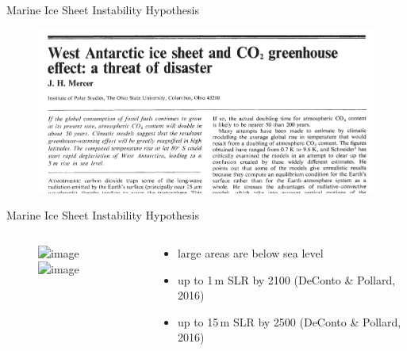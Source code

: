 \documentclass[hide notes,intlimits]{beamer}
\begin{document}
\begin{frame}{Marine Ice Sheet Instability Hypothesis}
 \begin{figure}
    \includegraphics[width=\textwidth]{mercer_1978}
  \end{figure}
\end{frame}

\begin{frame}{Marine Ice Sheet Instability Hypothesis}
  \begin{columns}[c]
    \begin{column}{.65\linewidth}
      \begin{figure}
        \includegraphics<1>[height=8cm]{ant-marine}
        \includegraphics<2>[height=8cm]{ant-shelves}
      \end{figure}
    \end{column}
    \begin{column}{.38\linewidth}
      \begin{itemize}
      \item large areas are below sea level
      \item up to 1\,m SLR by 2100 (DeConto \& Pollard, 2016)
      \item up to 15\,m SLR by 2500 (DeConto \& Pollard, 2016)
      \end{itemize}
    \end{column}
  \end{columns}
\end{frame}
\end{document}
